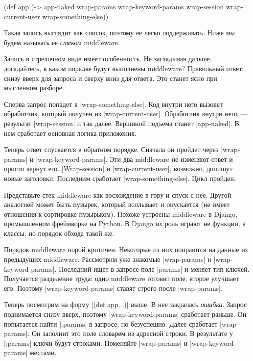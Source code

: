 \begin{english}
  \begin{clojure}
(def app
  (-> app-naked
      wrap-params
      wrap-keyword-params
      wrap-session
      wrap-current-user
      wrap-something-else))
  \end{clojure}
\end{english}

Такая запись выглядит как список, поэтому ее легко поддерживать. Ниже мы будем
называть ее \emph{стеком} middleware.

Запись в стрелочном виде имеет особенность. Не заглядывая дальше, догадайтесь, в
каком порядке будут выполнены middleware? Правильный ответ: снизу вверх для
запроса и сверху вниз для ответа. Это станет ясно при мысленном разборе.

Сперва запрос попадет в \spverb|wrap-something-else|. Код внутри него вызовет
обработчик, который получен из \spverb|wrap-current-user|. Обработчик внутри
него~--- результат \spverb|wrap-session| и так далее. Вершиной подъема станет
\spverb|app-naked|. В нем сработает основная логика приложения.

Теперь ответ спускается в обратном порядке. Сначала он пройдет через
\spverb|wrap-params| и \spverb|wrap-keyword-params|. Эти два middleware не
изменяют ответ и просто вернут его. \spverb|Wrap-session| и
\spverb|wrap-current-user|, возможно, допишут новые заголовки. Последним
сработает \spverb|wrap-something-else|. Цикл пройден.

Представьте стек middleware как восхождение в гору и спуск с нее. Другой
аналогией может быть пузырек, который всплывает и опускается (не имеет отношения
к сортировке пузырьком). Похоже устроены middleware в Django, промышленном
фреймворке на Python. В Django их роль играют не функции, а классы, но порядок
обхода такой же.

Порядок middleware порой критичен. Некоторые из них опираются на данные из
предыдущих middleware. Рассмотрим уже знакомые \spverb|wrap-params| и
\spverb|wrap-keyword-params|. Последний ищет в запросе поле \spverb|params| и
меняет тип ключей. Получается разделение труда: одно middleware готовит поле,
второе улучшает его. Поэтому \spverb|wrap-keyword-params| ставят строго после
\spverb|wrap-params|.

Теперь посмотрим на форму \spverb|(def app...)| выше. В нее закралась
\emph{ошибка}. Запрос поднимается снизу вверх, поэтому
\spverb|wrap-keyword-params| сработает раньше. Он попытается найти
\spverb|:params| в запросе, но безуспешно. Далее сработает
\spverb|wrap-params|. Он заполнит это поле словарем из адресной строки. В
результате у \spverb|:params| ключи будут строками. Поменяйте
\spverb|wrap-params| и \spverb|wrap-keyword-params| местами.

